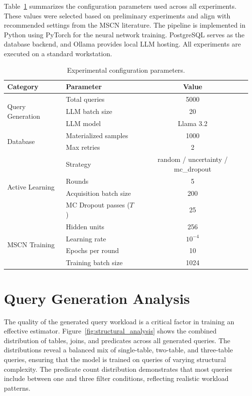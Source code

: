 Table~\ref{tab:exp_config} summarizes the configuration parameters used across all experiments. These values were selected based on preliminary experiments and align with recommended settings from the MSCN literature. The pipeline is implemented in Python using PyTorch for the neural network training. PostgreSQL serves as the database backend, and Ollama provides local LLM hosting. All experiments are executed on a standard workstation.

\begin{table}[tb]
\centering
\caption{Experimental configuration parameters.}
\label{tab:exp_config}
\begin{tabular}{|l|l|c|}
\hline
\textbf{Category} & \textbf{Parameter} & \textbf{Value} \\
\hline
\multirow{3}{*}{Query Generation} & Total queries & 5000 \\
 & LLM batch size & 20 \\
 & LLM model & Llama 3.2 \\
\hline
\multirow{2}{*}{Database} & Materialized samples & 1000 \\
 & Max retries & 2 \\
\hline
\multirow{4}{*}{Active Learning} & Strategy & random / uncertainty / mc\_dropout \\
 & Rounds & 5 \\
 & Acquisition batch size & 200 \\
 & MC Dropout passes ($T$) & 25 \\
\hline
\multirow{4}{*}{MSCN Training} & Hidden units & 256 \\
 & Learning rate & $10^{-4}$ \\
 & Epochs per round & 10 \\
 & Training batch size & 1024 \\
\hline
\end{tabular}
\end{table}

\section{Query Generation Analysis}

The quality of the generated query workload is a critical factor in training an effective estimator. Figure~\ref{fig:structural_analysis} shows the combined distribution of tables, joins, and predicates across all generated queries. The distributions reveal a balanced mix of single-table, two-table, and three-table queries, ensuring that the model is trained on queries of varying structural complexity. The predicate count distribution demonstrates that most queries include between one and three filter conditions, reflecting realistic workload patterns.

